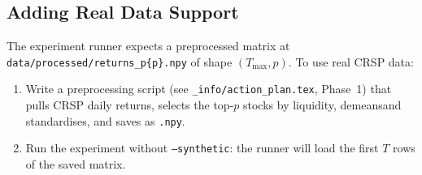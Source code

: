 \documentclass[11pt,a4paper]{article}
\begin{document}
\subsection{Adding Real Data Support}

The experiment runner expects a preprocessed matrix at \texttt{data/processed/returns\_p\{p\}.npy} of shape $(T_{\max}, p)$. To use real CRSP data:
\begin{enumerate}[nosep]
  \item Write a preprocessing script (see \texttt{\_info/action\_plan.tex}, Phase~1) that pulls CRSP daily returns, selects the top-$p$ stocks by liquidity, demeansand standardises, and saves as \texttt{.npy}.
  \item Run the experiment without \texttt{--synthetic}: the runner will load the first $T$ rows of the saved matrix.
\end{enumerate}
\end{document}
